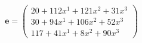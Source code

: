 \documentclass[preview]{standalone}
\begin{document}
\begin{align*}
\mathbf{e} = \begin{pmatrix}20 + 112x^{1} + 121x^{2} + 31x^{3} \\ 30 + 94x^{1} + 106x^{2} + 52x^{3} \\ 117 + 41x^{1} + 8x^{2} + 90x^{3}\end{pmatrix}
\end{align*}
\end{document}
